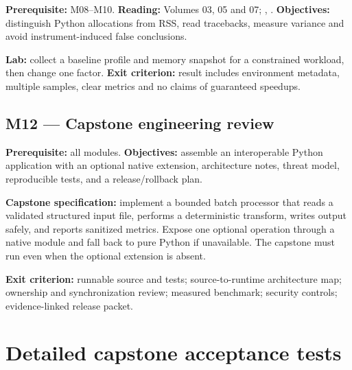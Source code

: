 \documentclass[
  11pt,
]{report}
\begin{document}
\textbf{Prerequisite:} M08--M10. \textbf{Reading:} Volumes 03, 05 and
07; ,
.
\textbf{Objectives:} distinguish Python allocations from RSS, read
tracebacks, measure variance and avoid instrument-induced false
conclusions.

\textbf{Lab:} collect a baseline profile and memory snapshot for a
constrained workload, then change one factor. \textbf{Exit criterion:}
result includes environment metadata, multiple samples, clear metrics
and no claims of guaranteed speedups.

\section{M12 --- Capstone engineering
review}\label{m12-capstone-engineering-review}

\textbf{Prerequisite:} all modules. \textbf{Objectives:} assemble an
interoperable Python application with an optional native extension,
architecture notes, threat model, reproducible tests, and a
release/rollback plan.

\textbf{Capstone specification:} implement a bounded batch processor
that reads a validated structured input file, performs a deterministic
transform, writes output safely, and reports sanitized metrics. Expose
one optional operation through a native module and fall back to pure
Python if unavailable. The capstone must run even when the optional
extension is absent.

\textbf{Exit criterion:} runnable source and tests; source-to-runtime
architecture map; ownership and synchronization review; measured
benchmark; security controls; evidence-linked release packet.

\chapter{Detailed capstone acceptance
tests}\label{detailed-capstone-acceptance-tests}
\end{document}
